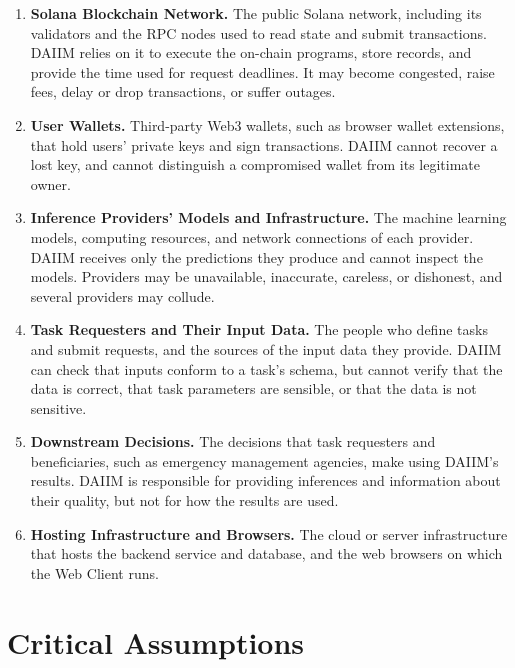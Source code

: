 \documentclass{article}
\begin{document}
\begin{enumerate}

\item \textbf{Solana Blockchain Network.} The public Solana network, including
its validators and the RPC nodes used to read state and submit transactions.
DAIIM relies on it to execute the on-chain programs, store records, and provide
the time used for request deadlines. It may become congested, raise fees, delay
or drop transactions, or suffer outages.

\item \textbf{User Wallets.} Third-party Web3 wallets, such as browser wallet
extensions, that hold users' private keys and sign transactions. DAIIM cannot
recover a lost key, and cannot distinguish a compromised wallet from its
legitimate owner.

\item \textbf{Inference Providers' Models and Infrastructure.} The machine
learning models, computing resources, and network connections of each
provider. DAIIM receives only the predictions they produce and cannot inspect
the models. Providers may be unavailable, inaccurate, careless, or dishonest,
and several providers may collude.

\item \textbf{Task Requesters and Their Input Data.} The people who define tasks
and submit requests, and the sources of the input data they provide. DAIIM can
check that inputs conform to a task's schema, but cannot verify that the data
is correct, that task parameters are sensible, or that the data is not
sensitive.

\item \textbf{Downstream Decisions.} The decisions that task requesters and
beneficiaries, such as emergency management agencies, make using DAIIM's
results. DAIIM is responsible for providing inferences and information
about their quality, but not for how the results are used.

\item \textbf{Hosting Infrastructure and Browsers.} The cloud or server
infrastructure that hosts the backend service and database, and the web
browsers on which the Web Client runs.

\end{enumerate}

\section{Critical Assumptions}
\end{document}
